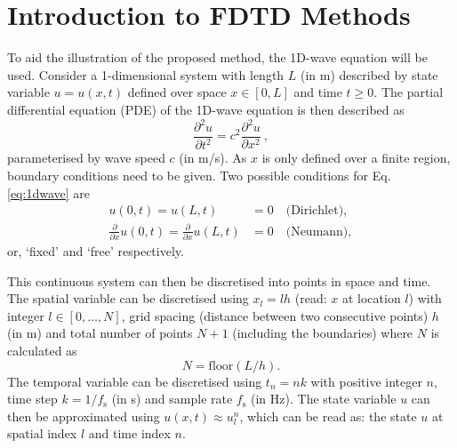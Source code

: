 \documentclass[preprint]{JASA}
\begin{document}
\section{\label{sec:2} Introduction to FDTD Methods}
To aid the illustration of the proposed method, the 1D-wave equation will be used. Consider a 1-dimensional system with length $L$ (in m) described by state variable $u = u(x, t)$ defined over space $x \in [0, L]$ and time $t \geq 0$. The partial differential equation (PDE) of the 1D-wave equation is then described as
\begin{equation}\label{eq:1dwave}
    \frac{\partial^2 u}{\partial t^2}= c^2\frac{\partial^2 u}{\partial x^2}\ ,
\end{equation}
parameterised by wave speed $c$ (in m/s). As $x$ is only defined over a finite region, boundary conditions need to be given. Two possible conditions for Eq. \eqref{eq:1dwave} are
\begin{subequations}\label{eq:continuousBoundaries}
    \begin{align}
        u(0, t) = u(L, t) &= 0\quad \text{(Dirichlet)},\\
        \frac{\partial}{\partial x} u(0, t) = \frac{\partial}{\partial x} u(L, t) &= 0\quad \text{(Neumann)},
    \end{align}
\end{subequations}
or, `fixed' and `free' respectively. 

This continuous system can then be discretised into points in space and time. The spatial variable can be discretised using $x_l = lh$ (read: $x$ at location $l$) with integer $l \in [0, \hdots, N]$, grid spacing (distance between two consecutive points) $h$ (in m) and total number of points $N + 1$ (including the boundaries) where $N$ is calculated as 
\begin{equation}\label{eq:numberOfPoints}
    N = \text{floor}(L/h).
\end{equation}
The temporal variable can be discretised using $t_n = nk$ with positive integer $n$, time step $k = 1/f_\text{s}$ (in s) and sample rate $f_\text{s}$ (in Hz). The state variable $u$ can then be approximated using $u(x,t) \approx u_l^n$, which can be read as: the state $u$ at spatial index $l$ and time index $n$.
\end{document}
